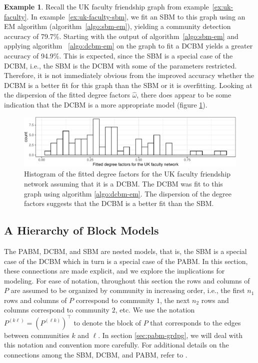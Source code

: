 \documentclass[
  12pt,
]{article}
\theoremstyle{definition}
\theoremstyle{definition}
\newtheorem{example}{Example}[section]
\theoremstyle{definition}
\theoremstyle{definition}
\theoremstyle{remark}
\begin{document}
\begin{example}
\label{ex:uk-faculty-dcbm-pabm}
Recall the UK faculty friendship graph from example~\ref{ex:uk-faculty}. 
In example~\ref{ex:uk-faculty-sbm}, we fit an SBM to this graph using an EM algorithm (algorithm~\ref{algo:sbm-em}), yielding a community detection accuracy of 79.7\%. 
Starting with the output of algorithm~\ref{algo:sbm-em} and applying algorithm ~\ref{algo:dcbm-em} on the graph to fit a DCBM yields a greater accuracy of 94.9\%. 
This is expected, since the SBM is a special case of the DCBM, i.e., the SBM is the DCBM with some of the parameters restricted. 
Therefore, it is not immediately obvious from the improved accuracy whether the DCBM is a better fit for this graph than the SBM or it is overfitting. 
Looking at the dispersion of the fitted degree factors $\hat{\omega}$, there does appear to be some indication that the DCBM is a more appropriate model (figure \ref{fig:uk-faculty-dcbm-omega}). 
\begin{figure}[H]

{\centering \includegraphics{draft_files/figure-latex/uk-faculty-dcbm-omega-1} 

}

\caption{Histogram of the fitted degree factors for the UK faculty friendship network assuming that it is a DCBM. The DCBM was fit to this graph using algorithm \ref{algo:dcbm-em}. The dispersion of the degree factors suggests that the DCBM is a better fit than the SBM.}\label{fig:uk-faculty-dcbm-omega}
\end{figure}
\end{example}

\hypertarget{sec:hierarchy}{%
\subsection{A Hierarchy of Block Models}\label{sec:hierarchy}}

The PABM, DCBM, and SBM are nested models, that is, the SBM is a special case of the DCBM which in turn is a special case of the PABM.
In this section, these connections are made explicit, and we explore the implications for modeling.
For ease of notation, throughout this section the rows and columns of \(P\) are assumed to be organized by community in increasing order, i.e., the first \(n_1\) rows and columns of \(P\) correspond to community \(1\), the next \(n_2\) rows and columns correspond to community \(2\), etc.
We use the notation \(P^{(k \ell)} = (P^{(\ell k)})^\top\) to denote the block of \(P\) that corresponds to the edges between communities \(k\) and \(\ell\).
In section \ref{sec:pabm-grdpg}, we will deal with this notation and convention more carefully.
For additional details on the connections among the SBM, DCBM, and PABM, refer to \citet{Noroozi2022}.
\end{document}
